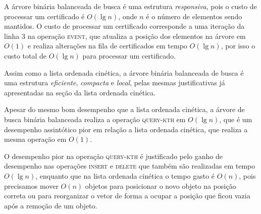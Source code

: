 A árvore binária balanceada de busca é uma estrutura \textit{responsiva}, pois o
custo de processar um certificado é $O(\lg{n})$, onde $n$ é o número de elementos sendo mantidos.
O custo de processar um certificado corresponde a uma iteração da linha $3$ na operação
\textsc{event}, que atualiza a posição dos elementos na árvore em $O(1)$ e realiza alterações na
fila de certificados em tempo $O(\lg{n})$, por isso o custo total de $O(\lg{n})$
para processar um certificado.

Assim como a lista ordenada cinética, a árvore binária balanceada de busca é uma
estrutura \textit{eficiente}, \textit{compacta} e \textit{local}, pelas mesmas
justificativas já apresentadas na seção da lista ordenada cinética.

Apesar do mesmo bom desempenho que a lista ordenada cinética, a árvore de busca
binária balanceada realiza a operação \textsc{query-kth} em $O(\lg{n})$, que é um
desempenho assintótico pior em relação a lista ordenada cinética, que realiza a
mesma operação em $O(1)$.

O desempenho pior na operação \textsc{query-kth} é justificado pelo ganho de
desempenho nas operações \textsc{insert} e \textsc{delete} que também são
realizadas em tempo $O(\lg{n})$, enquanto que na lista ordenada cinética o tempo
gasto é $O(n)$, pois precisamos mover $O(n)$ objetos para posicionar o novo
objeto na posição correta ou para reorganizar o vetor de forma a ocupar a
posição que ficou vazia após a remoção de um objeto.
